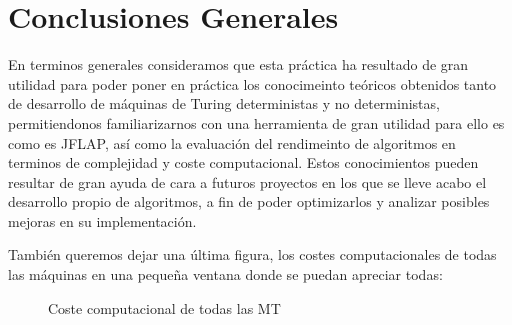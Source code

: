 \section{Conclusiones Generales}

En terminos generales consideramos que esta práctica ha resultado de gran utilidad para poder poner en práctica los conocimeinto teóricos obtenidos tanto de desarrollo de máquinas de Turing deterministas y no deterministas, permitiendonos familiarizarnos con una herramienta de gran utilidad para ello es como es JFLAP, así como la evaluación del rendimeinto de algoritmos en terminos de complejidad y coste computacional.
Estos conocimientos pueden resultar de gran ayuda de cara a futuros proyectos en los que se lleve acabo el desarrollo propio de algoritmos, a fin de poder optimizarlos y analizar posibles mejoras en su implementación.

\vfill

También queremos dejar una última figura, los costes computacionales de todas las máquinas en una pequeña ventana donde se puedan apreciar todas:
\begin{figure}[H]
  \centering
  
  \caption{Coste computacional de todas las MT}
\end{figure}
